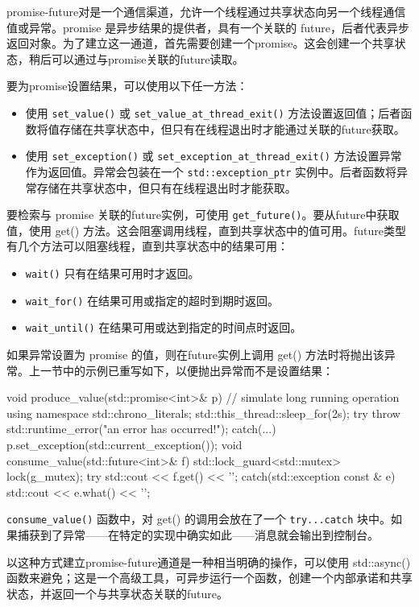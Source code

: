 
promise-future对是一个通信渠道，允许一个线程通过共享状态向另一个线程通信值或异常。promise 是异步结果的提供者，具有一个关联的 future，后者代表异步返回对象。为了建立这一通道，首先需要创建一个promise。这会创建一个共享状态，稍后可以通过与promise关联的future读取。

要为promise设置结果，可以使用以下任一方法：

\begin{itemize}
\item
使用 \verb|set_value()| 或 \verb|set_value_at_thread_exit()| 方法设置返回值；后者函数将值存储在共享状态中，但只有在线程退出时才能通过关联的future获取。

\item
使用 \verb|set_exception()| 或 \verb|set_exception_at_thread_exit()| 方法设置异常作为返回值。异常会包装在一个 \verb|std::exception_ptr| 实例中。后者函数将异常存储在共享状态中，但只有在线程退出时才能获取。
\end{itemize}

要检索与 promise 关联的future实例，可使用 \verb|get_future()|。要从future中获取值，使用 get() 方法。这会阻塞调用线程，直到共享状态中的值可用。future类型有几个方法可以阻塞线程，直到共享状态中的结果可用：

\begin{itemize}
\item
\verb|wait()| 只有在结果可用时才返回。

\item
\verb|wait_for()| 在结果可用或指定的超时到期时返回。

\item
\verb|wait_until()| 在结果可用或达到指定的时间点时返回。
\end{itemize}

如果异常设置为 promise 的值，则在future实例上调用 get() 方法时将抛出该异常。上一节中的示例已重写如下，以便抛出异常而不是设置结果：

\begin{cpp}
void produce_value(std::promise<int>& p)
{
    // simulate long running operation
    {
        using namespace std::chrono_literals;
        std::this_thread::sleep_for(2s);
    }
    try
    {
        throw std::runtime_error("an error has occurred!");
    }
    catch(...)
    {
        p.set_exception(std::current_exception());
    }
}
void consume_value(std::future<int>& f)
{
    std::lock_guard<std::mutex> lock(g_mutex);
    try
    {
        std::cout << f.get() << '\n';
    }
    catch(std::exception const & e)
    {
        std::cout << e.what() << '\n';
    }
}
\end{cpp}

\verb|consume_value()| 函数中，对 get() 的调用会放在了一个 \verb|try...catch| 块中。如果捕获到了异常——在特定的实现中确实如此——消息就会输出到控制台。


以这种方式建立promise-future通道是一种相当明确的操作，可以使用 std::async() 函数来避免；这是一个高级工具，可异步运行一个函数，创建一个内部承诺和共享状态，并返回一个与共享状态关联的future。

